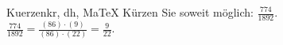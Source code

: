 \begin{MAufgabe}{Kuerzen}{kr, dh, MaTeX}
K\"urzen Sie soweit m\"oglich: $\frac{774}{1892}$.\\ 
\ifLsg\MLoesung
\quad $\frac{774}{1892}=\frac{(86)\cdot(9)}{(86)\cdot(22)}=\frac{9}{22}$.\else\relax\fi
 \end{MAufgabe}